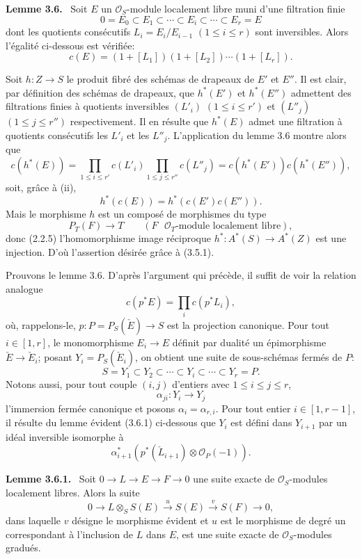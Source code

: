 \documentclass[11pt]{article}
\newenvironment{statement}[1]{\par\medskip\noindent\textbf{#1.}\ }{\par\medskip}
\begin{document}
\begin{statement}{Lemme 3.6}
Soit $E$ un $\mathcal O_S$-module localement libre muni d'une filtration finie
\[
0=E_0\subset E_1\subset\cdots\subset E_i\subset\cdots\subset E_r=E
\]
dont les quotients consécutifs $L_i=E_i/E_{i-1}$ $(1\le i\le r)$ sont inversibles. Alors l'égalité ci-dessous est vérifiée:
\[
c(E)=(1+[L_1])(1+[L_2])\cdots(1+[L_r]).
\]
\end{statement}

Soit $h:Z\to S$ le produit fibré des schémas de drapeaux de $E'$ et $E''$. Il est clair, par définition des schémas de drapeaux, que $h^*(E')$ et $h^*(E'')$ admettent des filtrations finies à quotients inversibles $(L'_i)$ $(1\le i\le r')$ et $(L''_j)$ $(1\le j\le r'')$ respectivement. Il en résulte que $h^*(E)$ admet une filtration à quotients consécutifs les $L'_i$ et les $L''_j$. L'application du lemme 3.6 montre alors que
\[
c(h^*(E))=
\prod_{1\le i\le r'}c(L'_i)\prod_{1\le j\le r''}c(L''_j)
=c(h^*(E'))c(h^*(E'')),
\]
soit, grâce à (ii),
\[
h^*(c(E))=h^*(c(E')c(E'')).
\tag{3.5.1}
\]
Mais le morphisme $h$ est un composé de morphismes du type
\[
P_T(F)\longrightarrow T
\qquad (F\text{ }\mathcal O_T\text{-module localement libre}),
\]
donc (2.2.5) l'homomorphisme image réciproque $h^*:A^*(S)\to A^*(Z)$ est une injection. D'où l'assertion désirée grâce à (3.5.1).

Prouvons le lemme 3.6. D'après l'argument qui précède, il suffit de voir la relation analogue
\[
c(p^*E)=\prod_i c(p^*L_i),
\]
où, rappelons-le, $p:P=P_S(\check E)\to S$ est la projection canonique. Pour tout $i\in[1,r]$, le monomorphisme $E_i\to E$ définit par dualité un épimorphisme $\check E\to\check E_i$; posant $Y_i=P_S(\check E_i)$, on obtient une suite de sous-schémas fermés de $P$:
\[
S=Y_1\subset Y_2\subset\cdots\subset Y_i\subset\cdots\subset Y_r=P.
\]
Notons aussi, pour tout couple $(i,j)$ d'entiers avec $1\le i\le j\le r$,
\[
\alpha_{ji}:Y_i\to Y_j
\]
l'immersion fermée canonique et posons $\alpha_i=\alpha_{r,i}$. Pour tout entier $i\in[1,r-1]$, il résulte du lemme évident (3.6.1) ci-dessous que $Y_i$ est défini dans $Y_{i+1}$ par un idéal inversible isomorphe à
\[
\alpha_{i+1}^*(p^*(\check L_{i+1})\otimes\mathcal O_P(-1)).
\]

\begin{statement}{Lemme 3.6.1}
Soit $0\to L\to E\to F\to0$ une suite exacte de $\mathcal O_S$-modules localement libres. Alors la suite
\[
0\to L\otimes_S S(E)\xrightarrow{u}S(E)\xrightarrow{v}S(F)\to0,
\]
dans laquelle $v$ désigne le morphisme évident et $u$ est le morphisme de degré un correspondant à l'inclusion de $L$ dans $E$, est une suite exacte de $\mathcal O_S$-modules gradués.
\end{statement}
\end{document}
